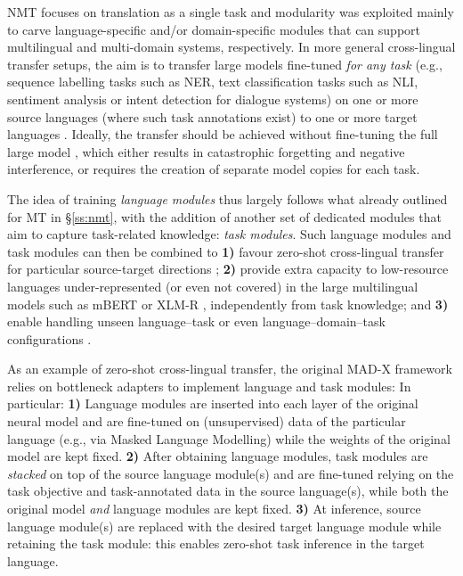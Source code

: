 NMT focuses on translation as a single task and modularity was exploited mainly to carve language-specific and/or domain-specific modules that can support multilingual and multi-domain systems, respectively. In more general cross-lingual transfer setups, the aim is to transfer large models \citep{Devlin:2019bert,conneau-etal-2020-unsupervised} fine-tuned \textit{for any task} (e.g., sequence labelling tasks such as NER, text classification tasks such as NLI, sentiment analysis or intent detection for dialogue systems) on one or more source languages (where such task annotations exist) to one or more target languages \citep{Hu:2020xtreme,Ruder:2021xtremer}. Ideally, the transfer should be achieved without fine-tuning the full large model \citep{Hu:2020xtreme}, which either results in catastrophic forgetting and negative interference, or requires the creation of separate model copies for each task.


The idea of training \textit{language modules} thus largely follows what already outlined for MT in \S\ref{ss:nmt}, with the addition of another set of dedicated modules that aim to capture task-related knowledge: \textit{task modules}. Such language modules and task modules can then be combined to \textbf{1)} favour zero-shot cross-lingual transfer for particular source-target directions \citep{pfeiffer-etal-2020-mad,Ansell2021MADG,ansell2021composable,Parovic2022BADX}; \textbf{2)} provide extra capacity to low-resource languages under-represented (or even not covered) in the large multilingual models such as mBERT or XLM-R \citep{Pfeiffer2021UNKs,Pfeiffer2022Lifting,ponti-etal-2020-xcopa,Faisal:2022arxiv}, independently from task knowledge; and \textbf{3)} enable handling unseen language--task or even language--domain--task configurations \citep{ponti-etal-2021-parameter,Stickland2021MultilingualDomainAdapt}. 



As an example of zero-shot cross-lingual transfer, the original MAD-X framework \citep[Figure~\ref{fig:CaseStudy:MADX}]{pfeiffer-etal-2020-mad} relies on bottleneck adapters to implement language and task modules: In particular: \textbf{1)} Language modules are inserted into each layer of the original neural model and are fine-tuned on (unsupervised) data of the particular language (e.g., via Masked Language Modelling) while the weights of the original model are kept fixed. \textbf{2)} After obtaining language modules, task modules are \textit{stacked} on top of the source language module(s) and are fine-tuned relying on the task objective and task-annotated data in the source language(s), while both the original model \textit{and} language modules are kept fixed. \textbf{3)} At inference, source language module(s) are replaced with the desired target language module while retaining the task module: this enables zero-shot task inference in the target language.

